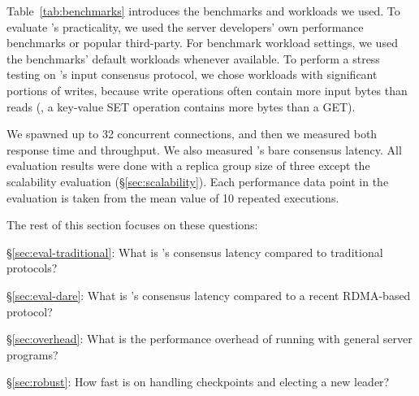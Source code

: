 Table~\ref{tab:benchmarks} introduces the benchmarks and workloads we used. To
evaluate \xxx's practicality, we used the server developers' own performance
benchmarks or popular third-party. For benchmark workload settings, we used the
benchmarks' default workloads whenever available. To perform a stress testing
on \xxx's input consensus protocol, we chose workloads with significant
portions of writes, because write operations often contain more input bytes than
reads (\eg, a key-value SET operation contains more bytes than a GET).

We spawned up to 32 concurrent connections, and then we measured both response
time and throughput. We also measured \xxx's bare consensus latency. All
evaluation results were done with a replica group size of three except the
scalability evaluation (\S\ref{sec:scalability}). Each performance data point in
the evaluation is taken from the mean value of 10 repeated executions.

The rest of this section focuses on these questions:

\begin{tightenum}

\item[\S\ref{sec:eval-traditional}:] What is \xxx's consensus latency compared
to traditional \paxos protocols?

\item[\S\ref{sec:eval-dare}:] What is \xxx's consensus latency compared
to a recent RDMA-based \paxos protocol?

\item[\S\ref{sec:overhead}:] What is the performance overhead of running \xxx
with general server programs?


\item[\S\ref{sec:robust}:] How fast is \xxx on handling checkpoints and
electing a new leader?



\end{tightenum}




